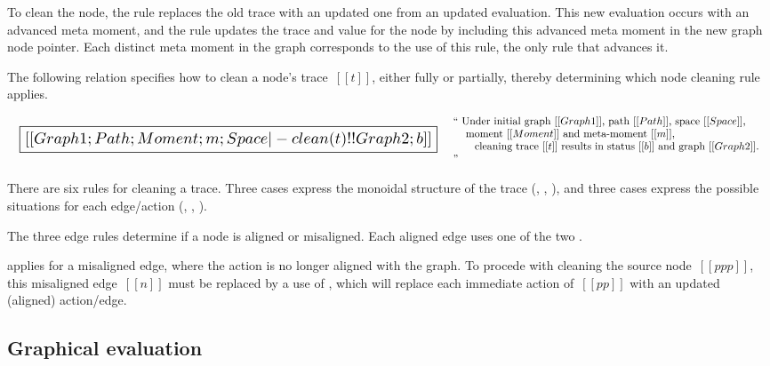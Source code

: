 \documentclass[11pt]{article}
\begin{document}
To clean the node, the rule replaces the old trace with an updated one
from an updated evaluation.
%
This new evaluation occurs with an advanced meta moment, and the rule
updates the trace and value for the node by including this advanced
meta moment in the new graph node pointer.
%
Each distinct meta moment in the graph corresponds to the use of this
rule, the only rule that advances it.


The following relation specifies how to clean a node's trace~$[[t]]$, either fully or partially,
thereby determining which node cleaning rule applies.

\[
\begin{array}{lc}
  {\scalebox{1.5}{
  \boxed{[[Graph1; Path; Moment; m; Space |- clean(t) !! Graph2; b]]}}}
&
\begin{array}{p{4in}}
  ``
  Under initial graph~$[[Graph1]]$,
  path~$[[Path]]$,
  space~$[[Space]]$,\\
  \hspace{3mm}~moment~$[[Moment]]$ and meta-moment~$[[m]]$,\\
  \hspace{6mm}~cleaning trace~$[[t]]$
  results in status~$[[b]]$ and graph~$[[Graph2]]$.
  ''
\end{array}
\end{array}
\]

\begin{mathpar}
\end{mathpar}

There are six rules for cleaning a trace.
%
Three cases express the monoidal structure of the
trace (, , ), and
three cases express the possible situations for each edge/action
(, ,
).

The three edge rules determine if a node is aligned or misaligned.
%
Each aligned edge uses one of the
two .

 applies for a misaligned edge, where the action
is no longer aligned with the graph.
%
To procede with cleaning the source node~$[[ppp]]$, this misaligned edge~$[[n]]$ must be
replaced by a use of , which will replace each
immediate action of~$[[pp]]$ with an updated (aligned) action/edge.

\subsection{Graphical evaluation}
\end{document}
